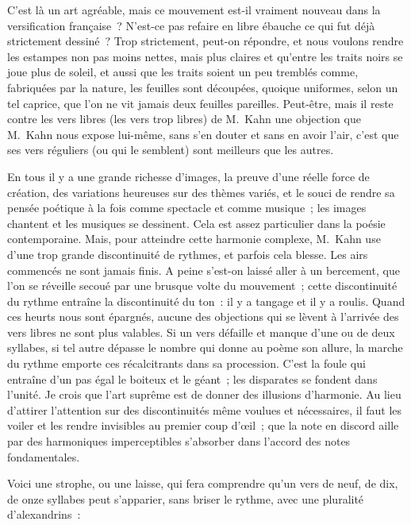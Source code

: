 \documentclass[french,twoside]{book} %
\begin{document}
\noindent C’est là un art agréable, mais ce mouvement est-il vraiment nouveau dans la versification française ? N’est-ce pas refaire en libre ébauche ce qui fut déjà strictement dessiné ? Trop strictement, peut-on répondre, et nous voulons rendre les estampes non pas moins nettes, mais plus claires et qu’entre les traits noirs se joue plus de soleil, et aussi que les traits soient un peu tremblés comme, fabriquées par la nature, les feuilles sont découpées, quoique uniformes, selon un tel caprice, que l’on ne vit jamais deux feuilles pareilles. Peut-être, mais il reste contre les vers libres (les vers trop libres) de M. Kahn une objection que M. Kahn nous expose lui-même, sans s’en douter et sans en avoir l’air, c’est que ses vers réguliers (ou qui le semblent) sont meilleurs que les autres.\par
En tous il y a une grande richesse d’images, la preuve d’une réelle force de création, des variations heureuses sur des thèmes variés, et le souci de rendre sa pensée poétique à la fois comme spectacle et comme musique ; les images chantent et les musiques se dessinent. Cela est assez particulier dans la poésie contemporaine. Mais, pour atteindre cette harmonie complexe, M. Kahn use d’une trop grande discontinuité de rythmes, et parfois cela blesse. Les airs commencés ne sont jamais finis. A peine s’est-on laissé aller à un bercement, que l’on se réveille secoué par une brusque volte du mouvement ; cette discontinuité du rythme entraîne la discontinuité du ton : il y a tangage et il y a roulis. Quand ces heurts nous sont épargnés, aucune des objections qui se lèvent à l’arrivée des vers libres ne sont plus valables. Si un vers défaille et manque d’une ou de deux syllabes, si tel autre dépasse le nombre qui donne au poème son allure, la marche du rythme emporte ces récalcitrants dans sa procession. C’est la foule qui entraîne d’un pas égal le boiteux et le géant ; les disparates se fondent dans l’unité. Je crois que l’art suprême est de donner des illusions d’harmonie. Au lieu d’attirer l’attention sur des discontinuités même voulues et nécessaires, il faut les voiler et les rendre invisibles au premier coup d’œil ; que la note en discord aille par des harmoniques imperceptibles s’absorber dans l’accord des notes fondamentales.\par
Voici une strophe, ou une laisse, qui fera comprendre qu’un vers de neuf, de dix, de onze syllabes peut s’apparier, sans briser le rythme, avec une pluralité d’alexandrins :\par
\end{document}

